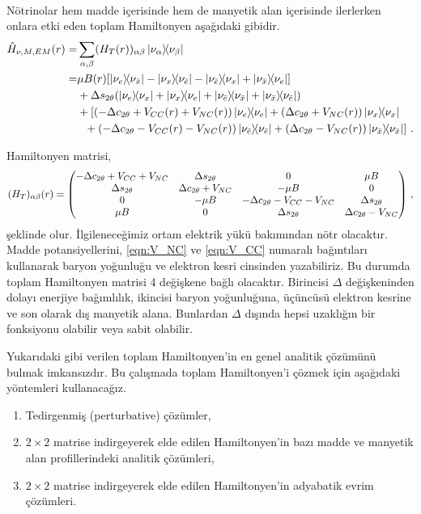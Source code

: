 \paragraph{}
Nötrinolar hem madde içerisinde hem de manyetik alan içerisinde ilerlerken onlara etki eden toplam Hamiltonyen aşağıdaki gibidir.
\begin{align}
	\nonumber \hat{H}_{\nu,M,EM}(r) =& \sum_{\alpha,\beta} (H_{T}(r))_{\alpha\beta} \dyad{\nu_{\alpha}}{\nu_{\beta}}\\
	 \nonumber=&\mu B(r) \qty[\dyad{\nu_{e}}{\nu_{\bar{x}}}-\dyad{\nu_{x}}{\nu_{\bar{e}}}-\dyad{\nu_{\bar{e}}}{\nu_{x}}+\dyad{\nu_{\bar{x}}}{\nu_{e}}] \\
	 \nonumber&+ \Delta s_{2\theta} \qty(\dyad{\nu_{e}}{\nu_{x}}+\dyad{\nu_{x}}{\nu_{e}}+\dyad{\nu_{\bar{e}}}{\nu_{\bar{x}}}+\dyad{\nu_{\bar{x}}}{\nu_{\bar{e}}}) \\
	 \nonumber & + [(-\Delta c_{2\theta} + V_{CC}(r) + V_{NC}(r))\dyad{\nu_{e}}{\nu_{e}}+(\Delta c_{2\theta}+V_{NC}(r))\dyad{\nu_{x}}{\nu_{x}} \\
	 &~~+(-\Delta c_{2\theta}-V_{CC}(r)-V_{NC}(r))\dyad{\nu_{\bar{e}}}{\nu_{\bar{e}}}+(\Delta c_{2\theta}-V_{NC}(r))\dyad{\nu_{\bar{x}}}{\nu_{\bar{x}}}] \text{ .}
\end{align}

Hamiltonyen matrisi,
\begin{equation} \label{eqn:HamiltonyenToplam}
	(H_{T})_{\alpha\beta}(r) = \mqty(-\Delta c_{2\theta}+V_{CC}+V_{NC} & \Delta s_{2\theta} & 0 & \mu B\\\Delta s_{2\theta} & \Delta c_{2\theta} + V_{NC}& -\mu B & 0
	\\0 & -\mu B& -\Delta c_{2\theta}-V_{CC}-V_{NC} & \Delta s_{2\theta}\\ \mu B& 0 & \Delta s_{2\theta} & \Delta c_{2\theta}-V_{NC} ) \text{ ,}
\end{equation}
şeklinde olur. İlgileneceğimiz ortam elektrik yükü bakımından nötr olacaktır. Madde potansiyellerini, \eqref{eqn:V_NC} ve \eqref{eqn:V_CC} numaralı bağıntıları kullanarak baryon yoğunluğu ve elektron kesri cinsinden yazabiliriz. Bu durumda toplam Hamiltonyen matrisi 4 değişkene bağlı olacaktır. Birincisi $ \Delta $ değişkeninden dolayı enerjiye bağımlılık, ikincisi baryon yoğunluğuna, üçüncüsü elektron kesrine ve son olarak dış manyetik alana. Bunlardan $ \Delta $ dışında hepsi uzaklığın bir fonksiyonu olabilir veya sabit olabilir.

Yukarıdaki gibi verilen toplam Hamiltonyen'in en genel analitik çözümünü bulmak imkansızdır. Bu çalışmada toplam Hamiltonyen'i çözmek için aşağıdaki yöntemleri kullanacağız.
\begin{enumerate}
	\item Tedirgenmiş (perturbative) çözümler,
	\item $ 2\times 2$ matrise indirgeyerek elde edilen Hamiltonyen'in bazı madde ve manyetik alan profillerindeki analitik çözümleri,
	\item $ 2\times 2$ matrise indirgeyerek elde edilen Hamiltonyen'in adyabatik evrim çözümleri.
\end{enumerate}


